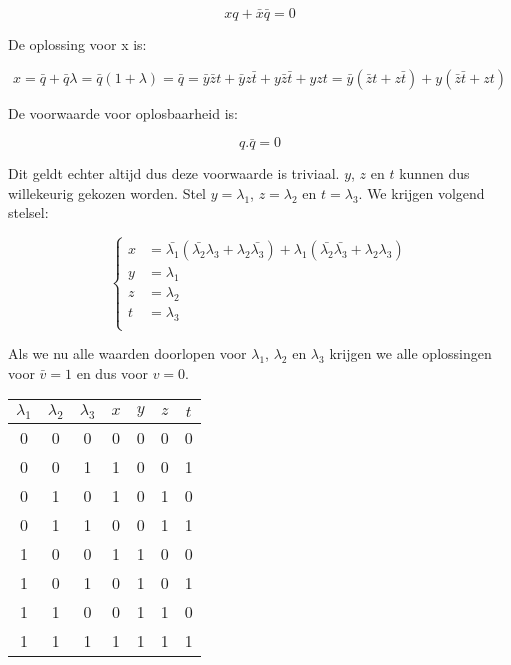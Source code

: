\documentclass[12pt]{article}
\newcommand{\ov}[1]{\bar{#1}}
\begin{document}
\begin{equation}
xq + \ov{x}\ov{q} = 0
\end{equation}

De oplossing voor x is:

\begin{equation}
x = \ov{q} + \ov{q}\lambda = \ov{q}(1+\lambda) = \ov{q} = \ov{y}\ov{z}t + \ov{y}z\ov{t} + y\ov{z}\ov{t} + yzt = \ov{y}(\ov{z}t + z\ov{t}) + y(\ov{z}\ov{t} + zt)
\end{equation}

De voorwaarde voor oplosbaarheid is:

\begin{equation}
q.\ov{q} = 0
\end{equation}

Dit geldt echter altijd dus deze voorwaarde is triviaal. $y$, $z$ en $t$ kunnen dus willekeurig gekozen worden. Stel $y = \lambda_{1}$, $z = \lambda_{2}$ en $t = \lambda_{3}$.
We krijgen volgend stelsel:

\begin{equation} 
	\begin{cases}
	    x &= \ov{\lambda_{1}}(\ov{\lambda_{2}}\lambda_{3} + \lambda_{2}\ov{\lambda_{3}})+\lambda_{1}(\ov{\lambda_{2}}\ov{\lambda_{3}}+\lambda_{2}\lambda_{3})\\
	    y &= \lambda_{1}\\
	    z &= \lambda_{2}\\
	    t &= \lambda_{3}\\
  	\end{cases}
\end{equation}

Als we nu alle waarden doorlopen voor  $\lambda_{1}$, $\lambda_{2}$ en $\lambda_{3}$ krijgen we alle oplossingen voor $\ov{v} = 1$ en dus voor $v = 0$.

\begin{table}[H]
\centering
\begin{tabular}{|c|c|c||c|c|c|c|}
	\hline
	\bf{$\lambda_{1}$} & \bf{$\lambda_{2}$} & \bf{$\lambda_{3}$} & \bf{$x$} & \bf{$y$} & \bf{$z$} & \bf{$t$} \\
	\hline
	0 & 0 & 0   &   0 & 0 & 0 & 0 \\
	0 & 0 & 1   &   1 & 0 & 0 & 1 \\
	0 & 1 & 0   &   1 & 0 & 1 & 0 \\
	0 & 1 & 1   &   0 & 0 & 1 & 1 \\
	1 & 0 & 0   &   1 & 1 & 0 & 0 \\
	1 & 0 & 1   &   0 & 1 & 0 & 1 \\
	1 & 1 & 0   &   0 & 1 & 1 & 0 \\
	1 & 1 & 1   &   1 & 1 & 1 & 1 \\
	\hline
\end{tabular}
\end{table}
\end{document}
